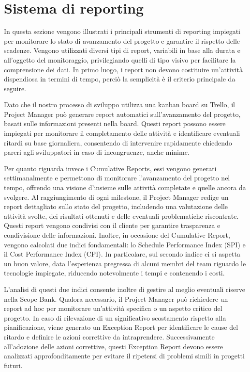 \documentclass[a4paper,12pt, openright]{report}
\begin{document}
\section{Sistema di reporting}
In questa sezione vengono illustrati i principali strumenti di reporting impiegati per monitorare lo stato di avanzamento del progetto e garantire il rispetto delle scadenze. Vengono utilizzati diversi tipi di report, variabili in base alla durata e all’oggetto del monitoraggio, privilegiando quelli di tipo visivo per facilitare la comprensione dei dati. In primo luogo, i report non devono costituire un'attività dispendiosa in termini di tempo, perciò la semplicità è il criterio principale da seguire.

Dato che il nostro processo di sviluppo utilizza una kanban board su Trello, il Project Manager può generare report automatici sull’avanzamento del progetto, basati sulle informazioni presenti nella board. Questi report possono essere impiegati per monitorare il completamento delle attività e identificare eventuali ritardi su base giornaliera, consentendo di intervenire rapidamente chiedendo pareri agli sviluppatori in caso di incongruenze, anche minime.

Per quanto riguarda invece i Cumulative Reports, essi vengono generati settimanalmente e permettono di monitorare l'avanzamento del progetto nel tempo, offrendo una visione d'insieme sulle attività completate e quelle ancora da svolgere. Al raggiungimento di ogni milestone, il Project Manager redige un report dettagliato sullo stato del progetto, includendo una valutazione delle attività svolte, dei risultati ottenuti e delle eventuali problematiche riscontrate. Questi report vengono condivisi con il cliente per garantire trasparenza e condivisione delle informazioni. Inoltre, in occasione del Cumulative Report, vengono calcolati due indici fondamentali: lo Schedule Performance Index (SPI) e il Cost Performance Index (CPI). In particolare, sul secondo indice ci si aspetta un buon valore, data l’esperienza pregressa di alcuni membri del team riguardo le tecnologie impiegate, riducendo notevolmente i tempi e contenendo i costi.

L’analisi di questi due indici consente inoltre di gestire al meglio eventuali riserve nella Scope Bank. Qualora necessario, il Project Manager può richiedere un report ad hoc per monitorare un’attività specifica o un aspetto critico del progetto. In caso di rilevazione di un significativo scostamento rispetto alla pianificazione, viene generato un Exception Report per identificare le cause del ritardo e definire le azioni correttive da intraprendere. Successivamente all'adozione delle azioni correttive, questi Exception Report devono essere analizzati approfonditamente per evitare il ripetersi di problemi simili in progetti futuri.
\end{document}
